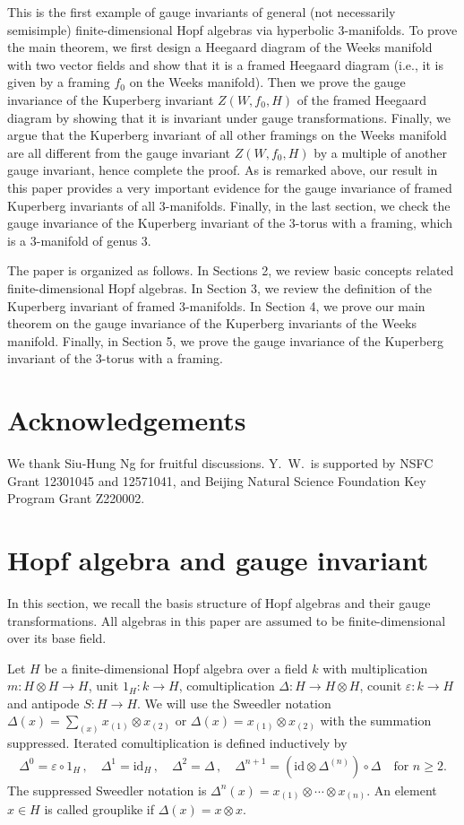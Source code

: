 \documentclass[12pt]{amsart}
\begin{document}
This is the first example of gauge invariants of general (not necessarily semisimple) finite-dimensional Hopf algebras via hyperbolic 3-manifolds. To prove the main theorem, we first design a Heegaard diagram of the Weeks manifold with two vector fields and show that it is a framed Heegaard diagram (i.e., it is given by a framing $f_0$ on the Weeks manifold). Then we prove the gauge invariance of the Kuperberg invariant $Z(W, f_0, H)$ of the framed Heegaard diagram by showing that it is invariant under gauge transformations. Finally, we argue that the Kuperberg invariant of all other framings on the Weeks manifold are all different from the gauge invariant $Z(W, f_0, H)$ by a multiple of another gauge invariant, hence complete the proof. As is remarked above, our result in this paper provides a very important evidence for the gauge invariance of framed Kuperberg invariants of all 3-manifolds. Finally, in the last section, we check the gauge invariance of the Kuperberg invariant of the 3-torus with a framing, which is a 3-manifold of genus 3.

The paper is organized as follows. In Sections 2, we review basic concepts related finite-dimensional Hopf algebras. In Section 3, we review the definition of the Kuperberg invariant of framed 3-manifolds. In Section 4, we prove our main theorem on the gauge invariance of the Kuperberg invariants of the Weeks manifold. Finally, in Section 5, we prove the gauge invariance of the Kuperberg invariant of the 3-torus with a framing.

\section*{Acknowledgements}
We thank Siu-Hung Ng for fruitful discussions. Y.~W.~is supported by NSFC Grant 12301045 and 12571041, and Beijing Natural Science Foundation Key Program Grant Z220002.

\section{Hopf algebra and gauge invariant}
In this section, we recall the basis structure of Hopf algebras and their gauge transformations. All algebras in this paper are assumed to be finite-dimensional over its base field. 

Let $H$ be a finite-dimensional Hopf algebra over a field $k$ with multiplication $m: H\otimes H\rightarrow H$, unit $1_H:k\rightarrow H$, comultiplication $\Delta: H\rightarrow H\otimes H$, counit $\varepsilon: k\rightarrow H$ and antipode
$S: H\rightarrow H$. We will use the Sweedler notation $\Delta(x)=\sum_{(x)}x_{(1)}\otimes x_{(2)}$ or 
$\Delta(x)=x_{(1)}\otimes x_{(2)}$ with the summation suppressed. 
Iterated comultiplication is defined inductively by
\[\begin{aligned}
	\Delta^0=\varepsilon\circ 1_H\,,\quad \Delta^1=\mathrm{id}_H\,,\quad \Delta^2=\Delta\,, \quad \Delta^{n+1}=(\mathrm{id}\otimes\Delta^{(n)})\circ \Delta \quad\text{for $n \ge 2$.}
\end{aligned}\]
The suppressed Sweedler notation is $\Delta^n(x)=x_{(1)}\otimes\cdots\otimes x_{(n)}$. An element $x\in H$ is called grouplike if $\Delta(x)=x\otimes x$.
\end{document}
